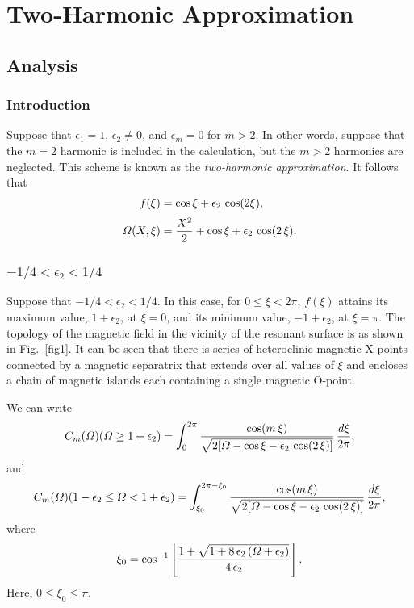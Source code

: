 \documentclass[12pt,prb,aps]{revtex4-1}
\begin{document}
\section{Two-Harmonic Approximation}
\subsection{Analysis}
\subsubsection{Introduction}
Suppose that $\epsilon_1=1$, $\epsilon_2\neq 0$,  and $\epsilon_m=0$ for $m>2$. In other words, suppose that the $m=2$ harmonic
is included in the calculation, but the $m>2$ harmonics are neglected.
This scheme is known as the {\em two-harmonic approximation}.  It follows that 
\begin{align}
f(\xi) &= \cos\xi + \epsilon_2\,\cos(2\xi),\label{e71a}\\[0.5ex]
{\mit\Omega}(X,\xi) &= \frac{X^2}{2}+\cos\xi + \epsilon_2\,\cos(2\,\xi).
\end{align}

\subsubsection{$-1/4 < \epsilon_2 < 1/4$}
Suppose that $-1/4<\epsilon_2< 1/4$. In this case, for $0\leq \xi< 2\pi$, $f(\xi)$ attains its maximum value, $1+\epsilon_2$, at $\xi=0$, and its minimum value, $-1+\epsilon_2$, at $\xi=\pi$.  The topology of the magnetic field 
in the vicinity of the resonant surface is as shown in Fig.~\ref{fig1}. It can be seen that there is series of heteroclinic magnetic X-points connected by a
magnetic separatrix that extends over all values of $\xi$ and encloses a chain of magnetic islands each containing a
single magnetic O-point. 

We can write 
\begin{equation}
C_m({\mit\Omega})({\mit\Omega}\geq 1+\epsilon_2) = \int_0^{2\pi}
\frac{\cos(m\,\xi)}{\sqrt{2[{\mit\Omega}-\cos\xi-\epsilon_2\,\cos(2\,\xi)]}}\,\frac{d\xi}{2\pi},
\end{equation} 
and
\begin{equation}
C_m({\mit\Omega})(1-\epsilon_2\leq {\mit\Omega}< 1+\epsilon_2) = \int_{\xi_0}^{2\pi-\xi_0}
\frac{\cos(m\,\xi)}{\sqrt{2[{\mit\Omega}-\cos\xi-\epsilon_2\,\cos(2\,\xi)]}}\,\frac{d\xi}{2\pi},
\end{equation} 
where
\begin{equation}\label{xi0}
\xi_0 =\cos^{-1}\left[\frac{1+\sqrt{1+8\,\epsilon_2\,({\mit\Omega}+\epsilon_2)}}{4\,\epsilon_2}\right].
\end{equation}
Here, $0\leq \xi_0\leq \pi$. 
\end{document}
